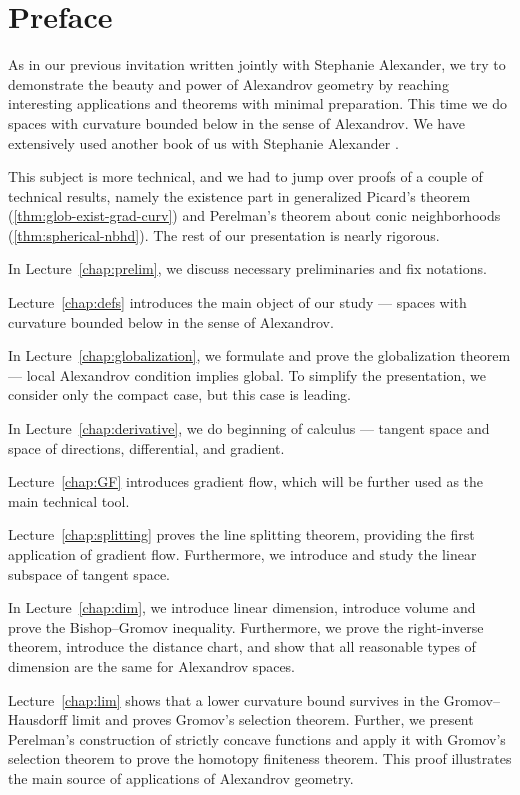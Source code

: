 \chapter*{Preface}

As in our previous invitation \cite{alexander-kapovitch-petrunin-2019} written jointly with Stephanie Alexander,
we try to demonstrate the beauty and power of Alexandrov geometry by reaching interesting applications and theorems with minimal preparation.
This time we do spaces with curvature bounded below in the sense of Alexandrov.
We have extensively used another book of us with Stephanie Alexander \cite{alexander-kapovitch-petrunin2024}.

This subject is more technical, and we had to jump over proofs of a couple of technical results,
namely the existence part in generalized Picard's theorem (\ref{thm:glob-exist-grad-curv})
and Perelman's theorem about conic neighborhoods (\ref{thm:spherical-nbhd}).
The rest of our presentation is nearly rigorous.

\medskip 

In Lecture~\ref{chap:prelim}, we discuss necessary preliminaries and fix notations.

Lecture~\ref{chap:defs} introduces the main object of our study --- spaces with curvature bounded below in the sense of Alexandrov.

In Lecture~\ref{chap:globalization}, we formulate and prove the globalization theorem --- local Alexandrov condition implies global.
To simplify the presentation, we consider only the compact case, but this case is leading.

In Lecture~\ref{chap:derivative}, we do beginning of calculus --- tangent space and space of directions, differential, and gradient.

Lecture~\ref{chap:GF} introduces gradient flow, which will be further used as the main technical tool.

Lecture~\ref{chap:splitting} proves the line splitting theorem, providing the first application of gradient flow.
Furthermore, we introduce and study the linear subspace of tangent space.

In Lecture~\ref{chap:dim}, we introduce linear dimension, introduce volume and prove the Bishop--Gromov inequality.
Furthermore, we prove the right-inverse theorem, introduce the distance chart, and show that all reasonable types of dimension are the 
same for Alexandrov spaces.

Lecture~\ref{chap:lim} shows that a lower curvature bound survives in the Gromov--Hausdorff limit and proves Gromov's selection theorem.
Further, we present Perelman's construction of strictly concave functions and apply it with Gromov's selection theorem to prove the homotopy finiteness theorem.
This proof illustrates the main source of applications of Alexandrov geometry.

